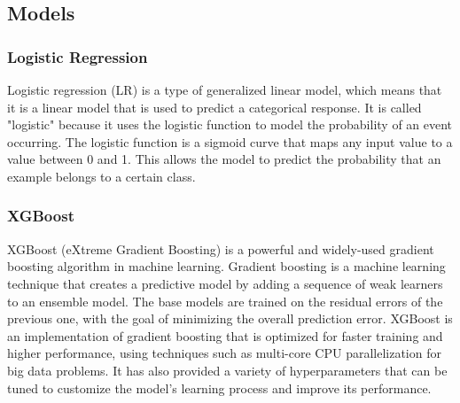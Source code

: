 \documentclass[11pt]{article}
\begin{document}
\vspace{-0.2cm}
\subsection{Models}
\subsubsection{Logistic Regression}
Logistic regression (LR) is a type of generalized linear model, which means that it is a linear model that is used to predict a categorical response. It is called "logistic" because it uses the logistic function to model the probability of an event occurring. The logistic function is a sigmoid curve that maps any input value to a value between 0 and 1. This allows the model to predict the probability that an example belongs to a certain class. 

\subsubsection{XGBoost}
XGBoost\citep{xgboost} (eXtreme Gradient Boosting) is a powerful and widely-used gradient boosting algorithm in machine learning. Gradient boosting is a machine learning technique that creates a predictive model by adding a sequence of weak learners to an ensemble model. The base models are trained on the residual errors of the previous one, with the goal of minimizing the overall prediction error. XGBoost is an implementation of gradient boosting that is optimized for faster training and higher performance, using techniques such as multi-core CPU parallelization for big data problems. It has also provided a variety of hyperparameters that can be tuned to customize the model's learning process and improve its performance.
\end{document}
